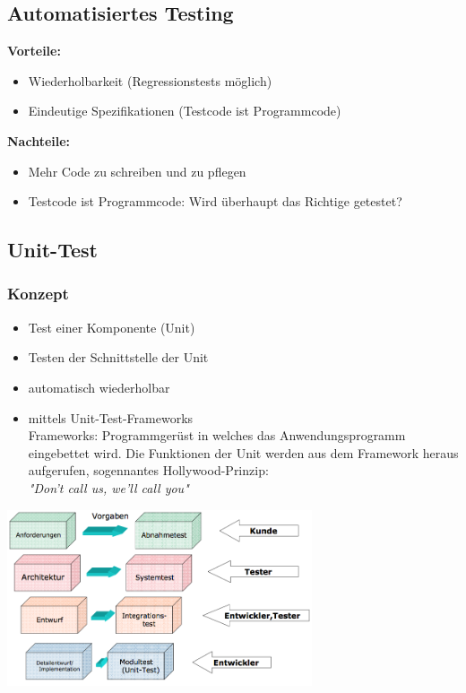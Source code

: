 \subsection{Automatisiertes Testing}
\textbf{Vorteile:}
\begin{itemize}
	\item Wiederholbarkeit (Regressionstests möglich)
	\item Eindeutige Spezifikationen (Testcode ist Programmcode)
\end{itemize}	
\textbf{Nachteile:}
\begin{itemize}
	\item Mehr Code zu schreiben und zu pflegen
	\item Testcode ist Programmcode: Wird überhaupt das Richtige getestet?
\end{itemize}

\subsection{Unit-Test}
\subsubsection{Konzept}
\begin{minipage}{10.5cm}
	\begin{itemize}
		\item Test einer Komponente (Unit)
		\item Testen der Schnittstelle der Unit
		\item automatisch wiederholbar
		\item mittels Unit-Test-Frameworks \\
		Frameworks: Programmgerüst in welches das Anwendungsprogramm eingebettet wird. Die Funktionen der Unit werden aus dem Framework heraus aufgerufen, sogennantes Hollywood-Prinzip:\\
		\textit{"{}Don't call us, we'll call you"}
	\end{itemize}
\end{minipage}
\begin{minipage}{9cm}
	\includegraphics[width=9cm]{images/wer_testet.png}
\end{minipage}

